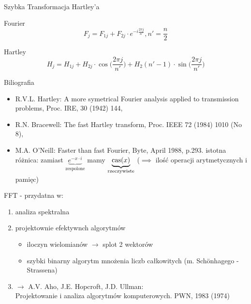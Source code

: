 \begin{frame}{Szybka Transformacja Hartley'a}
	\begin{block}{Fourier}
	\[
		F_j = F_{1j} + F_{2j} \cdot e^{-i\frac{2\pi j}{n'}} , n' = \frac{n}{2}
	\]
	\end{block}
	\begin{block}{Hartley}
	\[
		H_j = H_{1j} + H_{2j} \cdot \cos \bigg( \frac{2\pi j}{n'} \bigg) + H_2(n'-1) \cdot \sin \bigg( \frac{2\pi j}{n'} \bigg)
	\]
	\end{block}
\end{frame}
\begin{frame}{Biliografia}
	\begin{itemize}
		\item R.V.L. Hartley: A more symetrical Fourier analysis applied to transmission problems, Proc. IRE, 30 (1942) 144, \\
		\item R.N. Bracewell: The fast Hartley transform, Proc. IEEE 72 (1984) 1010 (No 8), \\
		\item M.A. O'Neill: Faster than fast Fourier, Byte, April 1988, p.293. istotna różnica: zamiast $\underbrace{e^{-x \cdot i}}_{\text{zespolone}}$ mamy $\underbrace{\operatorname{cas}(x)}_{\text{rzeczywiste}}$ ($\implies$ ilość operacji arytmetycznych i pamięc)
	\end{itemize}
\end{frame}
\begin{frame}{FFT - przydatna w:}
	\begin{enumerate}
		\item analiza spektralna \\
		\item projektownie efektywnch algorytmów
		\begin{itemize}
			\item iloczyn wielomianów $\to$ splot 2 wektorów \\
			\item szybki binarny algorytm mnożenia liczb całkowitych
			(m. Sch\"{o}nhagego - Strassena)
		\end{itemize}
		\item $\to$ A.V. Aho, J.E. Hopcroft, J.D. Ullman: \\
		Projektowanie i analiza algorytmów komputerowych. PWN, 1983 (1974)
	\end{enumerate}
\end{frame}